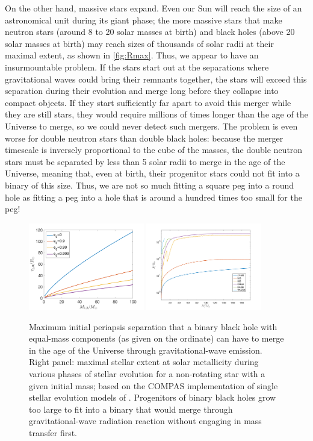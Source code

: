 \documentclass[iop,onecolumn]{revtex4}
\begin{document}
On the other hand, massive stars expand.  Even our Sun will reach the size of an astronomical unit during its giant phase; the more massive stars that make neutron stars (around 8 to 20 solar masses at birth) and black holes (above 20 solar masses at birth) may reach sizes of thousands of solar radii at their maximal extent, as shown in \autoref{fig:Rmax}.  Thus, we appear to have an insurmountable problem.  If the stars start out at the separations where gravitational waves could bring their remnants together, the stars will exceed this separation during their evolution and merge long before they collapse into compact objects. If they start sufficiently far apart to avoid this merger while they are still stars, they would require millions of times longer than the age of the Universe to merge, so we could never detect such mergers.  The problem is even worse for double neutron stars than double black holes: because the merger timescale is inversely proportional to the cube of the masses, the double neutron stars must be separated by less than 5 solar radii to merge in the age of the Universe, meaning that, even at birth, their progenitor stars could not fit into a binary of this size.  Thus, we are not so much fitting a square peg into a round hole as fitting a peg into a hole that is around a hundred times too small for the peg!

\begin{figure}
	\centering
	\includegraphics[width=0.45\textwidth]{M-rp.png}
	\includegraphics[width=0.45\textwidth]{StellarRadiusZsolar.png}
	\caption{Maximum initial periapsis separation that a binary black hole with equal-mass components (as given on the ordinate) can have to merge in the age of the Universe through gravitational-wave emission.	\label{fig:periapsis}  Right panel: maximal stellar extent at solar metallicity during various phases of stellar evolution for a non-rotating star with a given initial mass; based on the COMPAS implementation of single stellar evolution models of \citet{Hurley:2000}. \label{fig:Rmax} Progenitors of binary black holes grow too large to fit into a binary that would merge through gravitational-wave radiation reaction without engaging in mass transfer first.}
\end{figure}
\end{document}
